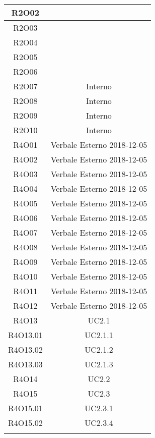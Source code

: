 \begin{tabularx}{\textwidth}{|C|C|}
	\hline
	R2O02&\\
	\hline
	R2O03&\\
	\hline
	R2O04&\\
	\hline
	R2O05&\\
	\hline
	R2O06&\\
	\hline
	R2O07&Interno\\
	\hline
	R2O08&Interno\\
	\hline
	R2O09&Interno\\
	\hline
	R2O10&Interno\\
	\hline
	R4O01&Verbale Esterno 2018-12-05\\
	\hline
	R4O02&Verbale Esterno 2018-12-05\\
	\hline
	R4O03&Verbale Esterno 2018-12-05\\
	\hline
	R4O04&Verbale Esterno 2018-12-05\\
	\hline
	R4O05&Verbale Esterno 2018-12-05\\
	\hline
	R4O06&Verbale Esterno 2018-12-05\\
	\hline
	R4O07&Verbale Esterno 2018-12-05\\
	\hline
	R4O08&Verbale Esterno 2018-12-05\\
	\hline
	R4O09&Verbale Esterno 2018-12-05\\
	\hline
	R4O10&Verbale Esterno 2018-12-05\\
	\hline
	R4O11&Verbale Esterno 2018-12-05\\
	\hline
	R4O12&Verbale Esterno 2018-12-05\\
	\hline
	R4O13& UC2.1\\
	\hline
	R4O13.01& UC2.1.1\\
	\hline
	R4O13.02& UC2.1.2\\
	\hline
	R4O13.03&UC2.1.3\\
	\hline
	R4O14&UC2.2\\
	\hline
	R4O15&UC2.3\\
	\hline
	R4O15.01&UC2.3.1\\
	\hline
	R4O15.02&UC2.3.4\\
	\hline
	\caption{Tabella requisiti-fonti}
\end{tabularx}